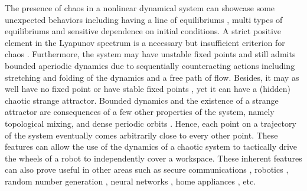 \documentclass[final,5p,times,twocolumn]{elsarticle}
\begin{document}
\label{intro} 
The presence of chaos in a nonlinear dynamical system 
can showcase some unexpected behaviors including having a line of equilibriums \cite{ahmadi2020novel,moysis2019analysis}, multi types of equilibriums \cite{xu20205d} and sensitive dependence on initial conditions. A strict positive element in the Lyapunov spectrum is a necessary but insufficient criterion for chaos \cite{sprott2010elegant}. Furthermore, the system may have unstable fixed points \cite{sambas2020investigation} and still admits bounded aperiodic dynamics due to sequentially counteracting actions including stretching and folding of the dynamics and a free path of flow. Besides, it may as well have no fixed point \cite{zhang2020simple} or have stable fixed points \cite{wang2017chaotic,pham2017generating}, yet it can have a (hidden) chaotic strange attractor. Bounded dynamics and the existence of a strange attractor are consequences of a few other properties of the system, namely topological mixing, and dense periodic orbits \cite{mendez2017new,pham2017different}. Hence, each point on a trajectory of the system eventually comes arbitrarily close to every other point. These features can allow the use of the dynamics of a chaotic system to tactically drive the wheels of a robot to independently cover a workspace. These inherent features can also prove useful in other areas such as secure communications \cite{kondrashov2019application,ccavucsouglu2019new,busawon2018brief,kocamaz2018secure,wang2018novel,bai2018chaos}, robotics \cite{vaidyanathan2017new,zang2016applications}, random number generation \cite{sprott2020chaotic,liao2019design,natiq2019dynamics}, neural networks \cite{de2017stable}, home appliances \cite{nomura1995non}, etc.
\end{document}
